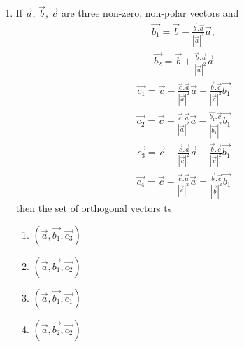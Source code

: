 \begin{enumerate}[label=\arabic*.,ref=\thesubsection.\theenumi]
\item If $\overrightarrow{a}$, $\overrightarrow{b}$, $\overrightarrow{c}$ are three non-zero, non-polar vectors and 
\begin{align*}
\overrightarrow{b_1} = \overrightarrow{b} - \frac{\overrightarrow{b}.\overrightarrow{a}}{|\overrightarrow{a}|^{2}}\overrightarrow{a},
\end{align*}
\begin{align*}
\overrightarrow{b_2} = \overrightarrow{b} + \frac{\overrightarrow{b}.\overrightarrow{a}}{|\overrightarrow{a}|^{2}}\overrightarrow{a} 
\end{align*}
\begin{align*}
\overrightarrow{c_1} = \overrightarrow{c} - \frac{\overrightarrow{c}.\overrightarrow{a}}{|\overrightarrow{a}|^{2}}\overrightarrow{a} + \frac{\overrightarrow{b}.\overrightarrow{c}}{|\overrightarrow{c}|^{2}}\overrightarrow{b_1}
\end{align*}
\begin{align*}
\overrightarrow{c_2} = \overrightarrow{c} - \frac{\overrightarrow{c}.\overrightarrow{a}}{|\overrightarrow{a}|^{2}}\overrightarrow{a} - \frac{\overrightarrow{b_1}.\overrightarrow{c}}{|\overrightarrow{b_1}|^{2}}\overrightarrow{b_1}
\end{align*}
\begin{align*}
\overrightarrow{c_3} = \overrightarrow{c} - \frac{\overrightarrow{c}.\overrightarrow{a}}{|\overrightarrow{c}|^{2}}\overrightarrow{a} + \frac{\overrightarrow{b}.\overrightarrow{c}}{|\overrightarrow{c}|^{2}}\overrightarrow{b_1}
\end{align*}
\begin{align*}
\overrightarrow{c_4} = \overrightarrow{c} - \frac{\overrightarrow{c}.\overrightarrow{a}}{|\overrightarrow{c}|^{2}}\overrightarrow{a} = \frac{\overrightarrow{b}.\overrightarrow{c}}{|\overrightarrow{b}|^{2}}\overrightarrow{b_1}
\end{align*}
then the set of orthogonal vectors ts
\begin{enumerate}
\item $(\overrightarrow{a}, \overrightarrow{b_1}, \overrightarrow{c_3})$
\item $(\overrightarrow{a}, \overrightarrow{b_1}, \overrightarrow{c_2})$
\item $(\overrightarrow{a}, \overrightarrow{b_1}, \overrightarrow{c_1})$
\item $(\overrightarrow{a}, \overrightarrow{b_2}, \overrightarrow{c_2})$
\end{enumerate}


\end{enumerate}
